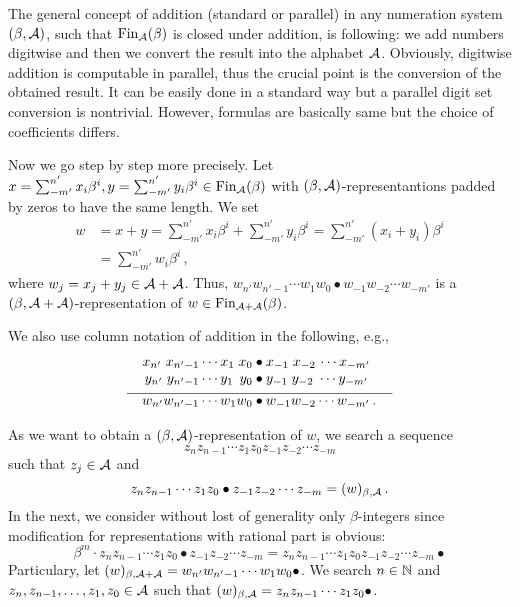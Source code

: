The general concept of addition (standard or parallel) in any numeration system $(\beta,\mathcal{A})$, such that $\text{Fin}_{\mathcal{A}}(\beta)$ is closed under addition, is following: we add numbers digitwise and then we convert the result into the alphabet $\mathcal{A}$. Obviously, digitwise addition is computable in parallel, thus the crucial point is the conversion of the obtained result. It can be easily done in a standard way but a parallel digit set conversion is nontrivial. However, formulas are basically same but the choice of coefficients differs.

Now we go step by step more precisely. Let $x=\sum_{-m'}^{n'} x_i\beta^i,y=\sum_{-m'}^{n'} y_i\beta^i \in \text{Fin}_{\mathcal{A}}(\beta)$ with $(\beta,\mathcal{A})$-representantions padded by zeros to have the same length. We set 
  \begin{align*}
    w&=x+y =\sum_{-m'}^{n'} x_i\beta^i + \sum_{-m'}^{n'} y_i\beta^i = \sum_{-m'}^{n'} (x_i+y_i)\beta^i \\
    &=\sum_{-m'}^{n'} w_i\beta^i \,,
  \end{align*}
  where $w_j=x_j+y_j \in \mathcal{A} +\mathcal{A}$. Thus, $w_{n'} w_{{n'}-1}\cdots w_1 w_0 \bullet w_{-1} w_{-2} \cdots w_{-m'}$ is a  $(\beta, \mathcal{A}+\mathcal{A})$-representation of $w\in \text{Fin}_{\mathcal{A}+\mathcal{A}}(\beta)$. 

We also use column notation of addition in the following, e.g.,     
  \begin{align*}
  x_{n'} \;x_{{n'}-1}\cdots x_1 \;x_0 &\bullet x_{-1} \;x_{-2}\, \cdots x_{-m'} \\[-3pt]
  y_{n'} \;y_{{n'}-1}\cdots y_1 \,\;y_0 &\bullet y_{-1} \;y_{-2} \;\cdots y_{-m'} \\[-7pt]
    \line(1,0){90} & \line(1,0){100} \\[-7pt]
  w_{n'} w_{{n'}-1}\cdots w_1 w_0 &\bullet w_{-1} w_{-2} \cdots w_{-m'}\,.
  \end{align*}
  
As we want to obtain a $(\beta,\mathcal{A})$-representation of $w$, we search a sequence 
  $$z_{n} z_{n-1}\cdots z_1 z_0 z_{-1} z_{-2} \cdots z_{-m}$$ such that $z_j \in \mathcal{A}$ and
  $$
    z_{n} z_{n-1}\cdots z_1 z_0 \bullet z_{-1} z_{-2} \cdots z_{-m}=(w)_{\beta,\mathcal{A}}\,.
  $$
  In the next, we consider without lost of generality only $\beta$-integers since modification for representations with rational part is obvious:
  $$
  \beta^m \cdot z_{n} z_{n-1}\cdots z_1 z_0 \bullet z_{-1} z_{-2} \cdots z_{-m} = z_{n} z_{n-1}\cdots z_1 z_0 z_{-1} z_{-2} \cdots z_{-m} \bullet
  $$  
  Particulary, let $(w)_{\beta, \mathcal{A}+\mathcal{A}}=w_{n'} w_{{n'}-1}\cdots w_1 w_0 \bullet$. We search $n \in \mathbb{N}$ and $z_{n}, z_{n-1},\dots, z_1, z_0 \in \mathcal{A}$ such that $(w)_{\beta, \mathcal{A}}=z_{n} z_{n-1}\cdots z_1 z_0 \bullet$.   
  
